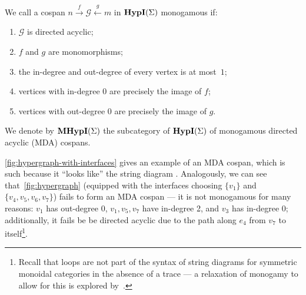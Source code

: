 \begin{definition}%
	\label{def:monogamy_hyp}
	We call a cospan $n \xrightarrow{f} \mathcal{G} \xleftarrow{g} m$ in $\textbf{HypI}(\Sigma)$ monogamous if:
	\begin{enumerate}
		\item $\mathcal{G}$ is directed acyclic;
		\item $f$ and $g$ are monomorphisms;
		\item the in-degree and out-degree of every vertex is at most~$1$;
		\item vertices with in-degree $0$ are precisely the image of $f$;
		\item vertices with out-degree $0$ are precisely the image of $g$.
	\end{enumerate}
	We denote by $\textbf{MHypI}(\Sigma)$ the subcategory of $\textbf{HypI}(\Sigma)$ of monogamous directed acyclic (MDA) cospans.
\end{definition}

\autoref{fig:hypergraph-with-interfaces} gives an example of an MDA cospan, which is such because it \enquote{looks like} the string diagram \comonoid.
Analogously, we can see that~\autoref{fig:hypergraph} (equipped with the interfaces choosing $\{ v_1 \}$ and $\{ v_4, v_5, v_6, v_7 \}$) fails to form an MDA cospan --- it is not monogamous for many reasons: $v_1$ has out-degree 0, $v_1, v_5, v_7$ have in-degree 2, and $v_3$ has in-degree 0; additionally, it fails be be directed acyclic due to the path along $e_4$ from $v_7$ to itself\footnote{Recall that loops are not part of the syntax of string diagrams for symmetric monoidal categories in the absence of a trace --- a relaxation of monogamy to allow for this is explored by~\citet{ghica_rewriting_2023}.}.

